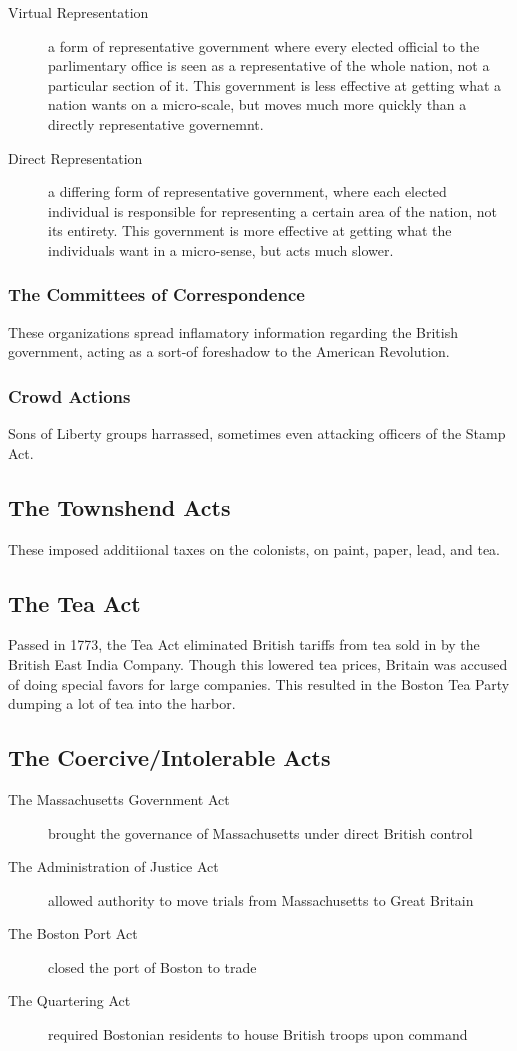 \begin{description}
  \item[Virtual Representation] a form of representative government where every
    elected official to the parlimentary office is seen as a representative of
    the whole nation, not a particular section of it.   This government is
    less effective at getting what a nation wants on a micro-scale, but moves
    much more quickly than a directly representative governemnt.
  \item[Direct Representation] a differing form of representative government,
    where each elected individual is responsible for representing a certain area
    of the nation, not its entirety.  This government is more effective at
    getting what the individuals want in a micro-sense, but acts much slower.
\end{description}

\subsubsection{The Committees of Correspondence}
These organizations spread inflamatory information regarding the British
government, acting as a sort-of foreshadow to the American Revolution.

\subsubsection{Crowd Actions}
Sons of Liberty groups harrassed, sometimes even attacking officers of the Stamp
Act.

\subsection{The Townshend Acts}
These imposed additiional taxes on the colonists, on paint, paper, lead, and
tea.

\subsection{The Tea Act}
Passed in 1773, the Tea Act eliminated British tariffs from tea sold in by the
British East India Company.  Though this lowered tea prices, Britain was accused
of doing special favors for large companies.  This resulted in the Boston Tea
Party dumping a lot of tea into the harbor.

\subsection{The Coercive/Intolerable Acts}
\begin{description}
  \item[The Massachusetts Government Act] brought the governance of
    Massachusetts under direct British control
  \item[The Administration of Justice Act] allowed authority to move trials from
    Massachusetts to Great Britain
  \item[The Boston Port Act] closed the port of Boston to trade
  \item[The Quartering Act] required Bostonian residents to house British troops
    upon command
\end{description}

